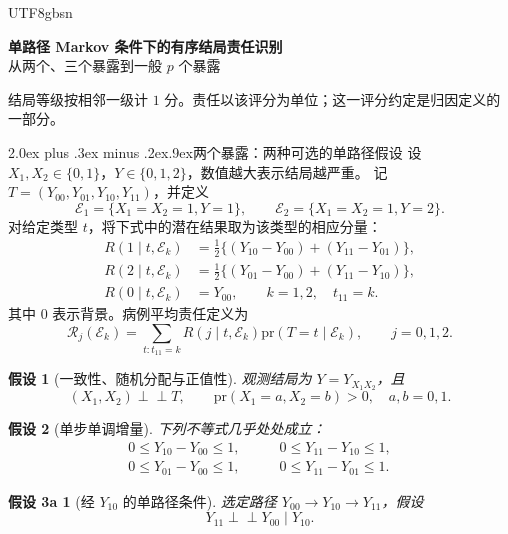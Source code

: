 \documentclass[11pt,a4paper]{article}
\makeatletter
\newcommand{\headingweight}{\ifPDFTeX\mdseries\else\bfseries\fi}
\renewcommand{\section}{\@startsection{section}{1}{0pt}
  {2.0ex plus .3ex minus .2ex}{.9ex}{\normalfont\large\headingweight}}
\newcommand{\indep}{\mathrel{\perp\!\!\!\perp}}
\theoremstyle{report}
\newtheorem{assumption}{假设}
\newtheorem*{markova}{假设 3a}
\newcommand{\pr}{\mathrm{pr}}
\makeatother
\begin{document}
\ifPDFTeX\begin{CJK*}{UTF8}{gbsn}\fi
\begin{center}
{\LARGE\headingweight 单路径 Markov 条件下的有序结局责任识别}\\[5pt]
{\large 从两个、三个暴露到一般 $p$ 个暴露}
\end{center}

结局等级按相邻一级计 $1$ 分。责任以该评分为单位；这一评分约定是归因定义的一部分。

\section{两个暴露：两种可选的单路径假设}
设 $X_1,X_2\in\{0,1\}$，$Y\in\{0,1,2\}$，数值越大表示结局越严重。
记 $T=(Y_{00},Y_{01},Y_{10},Y_{11})$，并定义
\[
\mathcal E_1=\{X_1=X_2=1,Y=1\},\qquad
\mathcal E_2=\{X_1=X_2=1,Y=2\}.
\]
对给定类型 $t$，将下式中的潜在结果取为该类型的相应分量：
\begin{equation}\label{eq:p2-score}
\begin{aligned}
R(1\mid t,\mathcal E_k)&=\tfrac12\{(Y_{10}-Y_{00})+(Y_{11}-Y_{01})\},\\
R(2\mid t,\mathcal E_k)&=\tfrac12\{(Y_{01}-Y_{00})+(Y_{11}-Y_{10})\},\\
R(0\mid t,\mathcal E_k)&=Y_{00},\qquad k=1,2,\quad t_{11}=k.
\end{aligned}
\end{equation}
其中 $0$ 表示背景。病例平均责任定义为
\[
\mathcal R_j(\mathcal E_k)
=\sum_{t:t_{11}=k}R(j\mid t,\mathcal E_k)\pr(T=t\mid\mathcal E_k),
\qquad j=0,1,2.
\]

\begin{assumption}[一致性、随机分配与正值性]\label{ass:p2-data}
观测结局为 $Y=Y_{X_1X_2}$，且
\[
(X_1,X_2)\indep T,\qquad
\pr(X_1=a,X_2=b)>0,\quad a,b=0,1.
\]
\end{assumption}

\begin{assumption}[单步单调增量]\label{ass:p2-unit}
下列不等式几乎处处成立：
\[
\begin{aligned}
0\le Y_{10}-Y_{00}\le1,\qquad&0\le Y_{11}-Y_{10}\le1,\\
0\le Y_{01}-Y_{00}\le1,\qquad&0\le Y_{11}-Y_{01}\le1.
\end{aligned}
\]
\end{assumption}

\begin{markova}[经 $Y_{10}$ 的单路径条件]
选定路径 $Y_{00}\longrightarrow Y_{10}\longrightarrow Y_{11}$，假设
\begin{equation}\label{eq:markov-a}
Y_{11}\indep Y_{00}\mid Y_{10}.
\end{equation}
\end{markova}


\end{CJK*}
\end{document}
